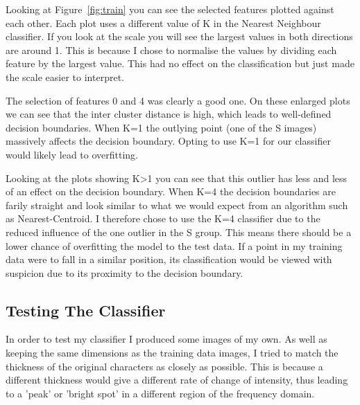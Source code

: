 \documentclass[11pt, a4paper]{article}
\begin{document}
Looking at Figure~\ref{fig:train} you can see the selected features plotted against each other. Each plot uses a different value of K in the Nearest Neighbour classifier. If you look at the scale you will see the largest values in both directions are around 1. This is because I chose to normalise the values by dividing each feature by the largest value. This had no effect on the classification but just made the scale easier to interpret.

The selection of features 0 and 4 was clearly a good one. On these enlarged plots we can see that the inter cluster distance is high, which leads to well-defined decision boundaries. When K=1 the outlying point (one of the S images) massively affects the decision boundary. Opting to use K=1 for our classifier would likely lead to overfitting. 

Looking at the plots showing K>1 you can see that this outlier has less and less of an effect on the decision boundary. When K=4 the decision boundaries are farily straight and look similar to what we would expect from an algorithm such as Nearest-Centroid.
I therefore chose to use the K=4 classifier due to the reduced influence of the one outlier in the S group. This means there should be a lower chance of overfitting the model to the test data. If a point in my training data were to fall in a similar position, its classification would be viewed with suspicion due to its proximity to the decision boundary. 

\subsection{Testing The Classifier}

In order to test my classifier I produced some images of my own. As well as keeping the same dimensions as the training data images, I tried to match the thickness of the original characters as closely as possible. This is because a different thickness would give a different rate of change of intensity, thus leading to a 'peak' or 'bright spot' in a different region of the frequency domain. 
\end{document}
